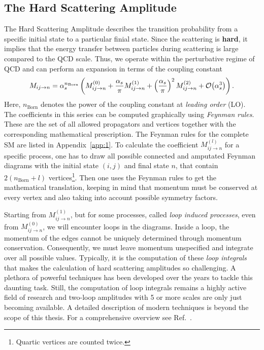 \subsection{The Hard Scattering Amplitude}
The Hard Scattering Amplitude describes the transition probability from a specific initial state to a particular finial state. Since the scattering is \textbf{hard}, it implies that the energy transfer between particles during scattering is large compared to the QCD scale. Thus, we operate within the perturbative regime of QCD and can perform an expansion in terms of the coupling constant
\begin{equation}
M_{ij \rightarrow n} = \alpha_s^{n_\text{Born}} \left( M_{ij \rightarrow n}^{(0)} + \frac{\alpha_s}{\pi} M_{ij \rightarrow n}^{(1)} + \left(\frac{\alpha_s}{\pi}\right)^2 M_{ij \rightarrow n}^{(2)} + \mathcal{O}\!\left(\alpha_s^3\right) \right).
\end{equation}
Here, $n_\text{Born}$ denotes the power of the coupling constant at \textit{leading order} (\acs{LO}). The coefficients in this series can be computed graphically using \textit{Feynman rules}. These are the set of all allowed propagators and vertices together with the corresponding mathematical prescription. The Feynman rules for the complete \acs{SM} are listed in Appendix~\ref{app:1}. To calculate the coefficient $M_{ij \rightarrow n}^{(l)}$ for a specific process, one has to draw all possible connected and amputated Feynman diagrams with the initial state $(i,j)$ and final state $n$, that contain $2(n_\text{Born} + l)$ vertices\footnote{Quartic vertices are counted twice.}. Then one uses the Feynman rules to get the mathematical translation, keeping in mind that momentum must be conserved at every vertex and also taking into account possible symmetry factors.

Starting from $M^{(1)}_{ij \rightarrow n}$, but for some processes, called \textit{loop induced processes}, even from $M^{(0)}_{ij \rightarrow n}$, we will encounter loops in the diagrams. Inside a loop, the momentum of the edges cannot be uniquely determined through momentum conservation. Consequently, we must leave momentum unspecified and integrate over all possible values. Typically, it is the computation of these \textit{loop integrals} that makes the calculation of hard scattering amplitudes so challenging. A plethora of powerful techniques has been developed over the years to tackle this daunting task. Still, the computation of loop integrals remains a highly active field of research and two-loop amplitudes with 5 or more scales are only just becoming available. A detailed description of modern techniques is beyond the scope of this thesis. For a comprehensive overview see Ref.~\cite{Weinzierl:2022eaz}.

